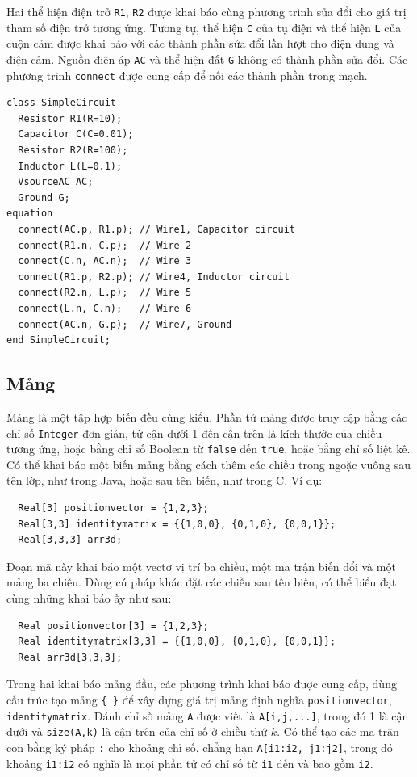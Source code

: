 Hai thể hiện điện trở \texttt{R1}, \texttt{R2} được khai báo cùng phương trình sửa đổi cho giá trị tham số điện trở tương ứng. Tương tự, thể hiện \texttt{C} của tụ điện và thể hiện \texttt{L} của cuộn cảm được khai báo với các thành phần sửa đổi lần lượt cho điện dung và điện cảm. Nguồn điện áp \texttt{AC} và thể hiện đất \texttt{G} không có thành phần sửa đổi. Các phương trình \texttt{connect} được cung cấp để nối các thành phần trong mạch.
\begin{verbatim}
class SimpleCircuit
  Resistor R1(R=10);
  Capacitor C(C=0.01);
  Resistor R2(R=100);
  Inductor L(L=0.1);
  VsourceAC AC;
  Ground G;
equation
  connect(AC.p, R1.p); // Wire1, Capacitor circuit
  connect(R1.n, C.p);  // Wire 2
  connect(C.n, AC.n);  // Wire 3
  connect(R1.p, R2.p); // Wire4, Inductor circuit
  connect(R2.n, L.p);  // Wire 5
  connect(L.n, C.n);   // Wire 6
  connect(AC.n, G.p);  // Wire7, Ground
end SimpleCircuit;
\end{verbatim}

\subsection{Mảng}
Mảng là một tập hợp biến đều cùng kiểu. Phần tử mảng được truy cập bằng các chỉ số \texttt{Integer} đơn giản, từ cận dưới 1 đến cận trên là kích thước của chiều tương ứng, hoặc bằng chỉ số Boolean từ \texttt{false} đến \texttt{true}, hoặc bằng chỉ số liệt kê. Có thể khai báo một biến mảng bằng cách thêm các chiều trong ngoặc vuông sau tên lớp, như trong Java, hoặc sau tên biến, như trong C. Ví dụ:
\begin{verbatim}
  Real[3] positionvector = {1,2,3};
  Real[3,3] identitymatrix = {{1,0,0}, {0,1,0}, {0,0,1}};
  Real[3,3,3] arr3d;
\end{verbatim}
Đoạn mã này khai báo một vectơ vị trí ba chiều, một ma trận biến đổi và một mảng ba chiều. Dùng cú pháp khác đặt các chiều sau tên biến, có thể biểu đạt cùng những khai báo ấy như sau:
\begin{verbatim}
  Real positionvector[3] = {1,2,3};
  Real identitymatrix[3,3] = {{1,0,0}, {0,1,0}, {0,0,1}};
  Real arr3d[3,3,3];
\end{verbatim}
Trong hai khai báo mảng đầu, các phương trình khai báo được cung cấp, dùng cấu trúc tạo mảng \texttt{\{ \}} để xây dựng giá trị mảng định nghĩa \texttt{positionvector}, \texttt{identitymatrix}. Đánh chỉ số mảng \texttt{A} được viết là \texttt{A[i,j,...]}, trong đó 1 là cận dưới và \texttt{size(A,k)} là cận trên của chỉ số ở chiều thứ $k$. Có thể tạo các ma trận con bằng ký pháp \texttt{:} cho khoảng chỉ số, chẳng hạn \texttt{A[i1:i2, j1:j2]}, trong đó khoảng \texttt{i1:i2} có nghĩa là mọi phần tử có chỉ số từ \texttt{i1} đến và bao gồm \texttt{i2}.

